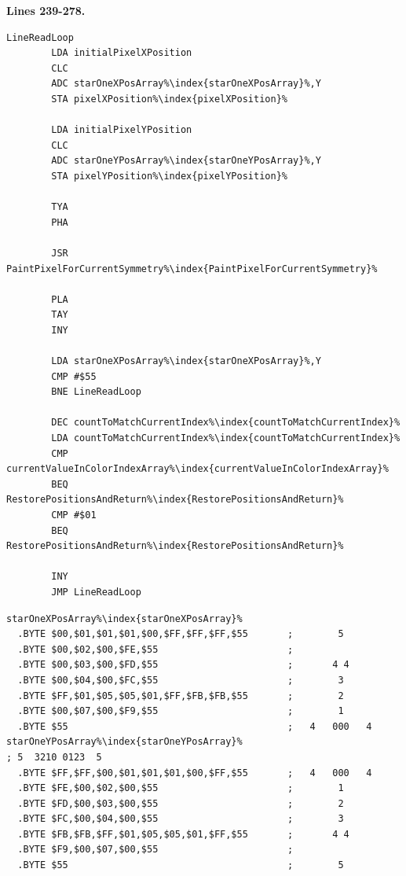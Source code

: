 \clearpage
\textbf{Lines 239-278. }
\begin{lstlisting}[caption=The core pattern-painting loop.,escapechar=\%]
LineReadLoop   
        LDA initialPixelXPosition
        CLC 
        ADC starOneXPosArray%\index{starOneXPosArray}%,Y
        STA pixelXPosition%\index{pixelXPosition}%

        LDA initialPixelYPosition
        CLC 
        ADC starOneYPosArray%\index{starOneYPosArray}%,Y
        STA pixelYPosition%\index{pixelYPosition}%

        TYA 
        PHA 

        JSR PaintPixelForCurrentSymmetry%\index{PaintPixelForCurrentSymmetry}%

        PLA 
        TAY 
        INY 

        LDA starOneXPosArray%\index{starOneXPosArray}%,Y
        CMP #$55
        BNE LineReadLoop

        DEC countToMatchCurrentIndex%\index{countToMatchCurrentIndex}%
        LDA countToMatchCurrentIndex%\index{countToMatchCurrentIndex}%
        CMP currentValueInColorIndexArray%\index{currentValueInColorIndexArray}%
        BEQ RestorePositionsAndReturn%\index{RestorePositionsAndReturn}%
        CMP #$01
        BEQ RestorePositionsAndReturn%\index{RestorePositionsAndReturn}%

        INY 
        JMP LineReadLoop

\end{lstlisting}
\begin{lstlisting}[escapechar=\%]
starOneXPosArray%\index{starOneXPosArray}%
  .BYTE $00,$01,$01,$01,$00,$FF,$FF,$FF,$55       ;        5       
  .BYTE $00,$02,$00,$FE,$55                       ;                
  .BYTE $00,$03,$00,$FD,$55                       ;       4 4      
  .BYTE $00,$04,$00,$FC,$55                       ;        3       
  .BYTE $FF,$01,$05,$05,$01,$FF,$FB,$FB,$55       ;        2       
  .BYTE $00,$07,$00,$F9,$55                       ;        1       
  .BYTE $55                                       ;   4   000   4  
starOneYPosArray%\index{starOneYPosArray}%                                  ; 5  3210 0123  5
  .BYTE $FF,$FF,$00,$01,$01,$01,$00,$FF,$55       ;   4   000   4  
  .BYTE $FE,$00,$02,$00,$55                       ;        1       
  .BYTE $FD,$00,$03,$00,$55                       ;        2       
  .BYTE $FC,$00,$04,$00,$55                       ;        3       
  .BYTE $FB,$FB,$FF,$01,$05,$05,$01,$FF,$55       ;       4 4      
  .BYTE $F9,$00,$07,$00,$55                       ;                
  .BYTE $55                                       ;        5       
                                                  
\end{lstlisting}
\clearpage

